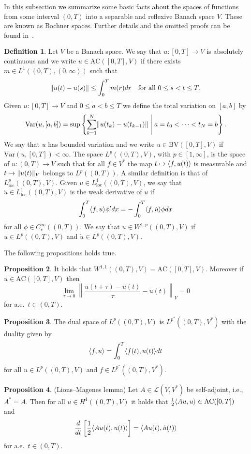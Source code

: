\documentclass[a4paper,10pt,oneside]{amsbook}
\numberwithin{section}{chapter}
\numberwithin{equation}{chapter}
\theoremstyle{definition}
\newtheorem{prop}{Proposition}[chapter]
\newtheorem{defi}[prop]{Definition}
\DeclarePairedDelimiter{\norm}{\lVert}{\rVert}
\DeclarePairedDelimiter{\dual}{\langle}{\rangle}
\begin{document}
In this subsection we summarize some basic facts about the spaces of functions from some interval $(0,T)$ into a separable and reflexive Banach space $V$. These are known as Bochner spaces. Further details and the omitted proofs can be found in~\cite{roubicek-pde}.
\begin{defi}
\label{defi:ac-bv}
Let $V$ be a Banach space. We say that $u\colon[0,T]\to V$ is absolutely continuous and we write $u\in\text{AC}([0,T],V)$ if there exists $m\in L^1((0,T),(0,\infty))$ such that
\begin{equation*}
\norm{u(t)-u(s)}\le\int_0^Tm(r)dr\quad\text{for all $0\le s<t\le T$.}
\end{equation*}
Given $u\colon[0,T]\to V$ and $0\le a<b\le T$ we define the total variation on $[a,b]$ by
\begin{equation*}
\text{Var}(u,[a,b])=\sup\left\{\sum_{k=1}^N\norm{u(t_k)-u(t_{k-1})}\;\middle|\;a=t_0<\dots<t_N=b\right\}.
\end{equation*}
We say that $u$ has bounded variation and we write $u\in\text{BV}([0,T],V)$ if $\text{Var}(u,[0,T])<\infty$. The space $L^p((0,T),V)$, with $p\in[1,\infty]$, is the space of $u\colon(0,T)\to V$ such that for all $f\in V^*$ the map $t\mapsto\dual{f,u(t)}$ is measurable and $t\mapsto\norm{u(t)}_V$ belongs to $L^p((0,T))$. A similar definition is that of $L^p_\text{loc}((0,T),V)$. Given $u\in L^1_\text{loc}((0,T),V)$, we say that $\dot u\in L^1_\text{loc}((0,T),V)$ is the weak derivative of $u$ if
\[
\int_0^T\dual{f,u}\phi'dx=-\int_0^T\dual{f,\dot u}\phi dx
\]
for all $\phi\in C^\infty_c((0,T))$. We say that $u\in W^{1,p}((0,T),V)$ if $u\in L^p((0,T),V)$ and $\dot u\in L^p((0,T),V)$.
\end{defi}
The following propositions holds true.
\begin{prop}
\label{prop:ac-w}
It holds that $W^{1,1}((0,T),V)=\text{AC}([0,T],V)$. Moreover if $u\in\text{AC}([0,T],V)$ then
\[
\lim_{\tau\to0}\left\|\frac{u(t+\tau)-u(t)}{\tau}-\dot u(t)\right\|_V=0
\]
for a.e.\ $t\in(0,T)$.
\end{prop}
\begin{prop}
The dual space of $L^p((0,T),V)$ is $L^{p^*}((0,T),V^*)$ with the duality given by
\[
\dual{f,u}=\int_0^T\dual{f(t),u(t)}dt
\]
for all $u\in L^p((0,T),V)$ and $f\in L^{p^*}((0,T),V^*)$.
\end{prop}
\begin{prop}(Lions--Magenes lemma)
\label{prop:lions-magenes}
Let $A\in\mathscr{L}(V,V^*)$ be self-adjoint, i.e., $A^*=A$. Then for all $u\in H^1((0,T),V)$ it holds that $\frac{1}{2}\dual{Au,u}\in\text{AC}([0,T])$ and
\[
\frac{d}{dt}\left[\frac{1}{2}\dual{Au(t),u(t)}\right]=\dual{Au(t),\dot u(t)}
\]
for a.e.\ $t\in(0,T)$.
\end{prop}
\end{document}
